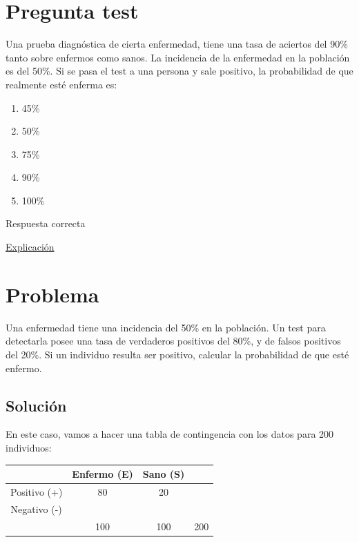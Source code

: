 \documentclass[
]{book}
\providecommand{\tightlist}{%
  \setlength{\itemsep}{0pt}\setlength{\parskip}{0pt}}
\begin{document}
\hypertarget{pregunta-test-176}{%
\section{Pregunta test}\label{pregunta-test-176}}

Una prueba diagnóstica de cierta enfermedad, tiene una tasa de aciertos del 90\% tanto sobre enfermos como sanos. La incidencia de la enfermedad en la población es del 50\%. Si se pasa el test a una persona y sale positivo, la probabilidad de que realmente esté enferma es:

\begin{enumerate}
\def\labelenumi{\alph{enumi})}
\tightlist
\item
  45\%
\item
  50\%
\item
  75\%
\item
  90\%
\item
  100\%
\end{enumerate}

Respuesta correcta

\href{https://1fjmanzano.github.io/bioestadistica/relaci\%C3\%B3n-entre-variables-cualitativas.html\#diagno\%CC\%81stico-cli\%CC\%81nico}{Explicación}

\hypertarget{problema-18}{%
\section{Problema}\label{problema-18}}

Una enfermedad tiene una incidencia del 50\% en la población. Un test para detectarla posee una tasa de verdaderos positivos del 80\%, y de falsos positivos del 20\%. Si un individuo resulta ser positivo, calcular la probabilidad de que esté enfermo.

\hypertarget{soluciuxf3n-15}{%
\subsection{Solución}\label{soluciuxf3n-15}}

En este caso, vamos a hacer una tabla de contingencia con los datos para 200 individuos:

\begin{longtable}[]{@{}cccc@{}}
\toprule
& Enfermo (E) & Sano (S) &\tabularnewline
\midrule
\endhead
Positivo (+) & 80 & 20 &\tabularnewline
Negativo (-) & & &\tabularnewline
& 100 & 100 & 200\tabularnewline
\bottomrule
\end{longtable}
\end{document}
